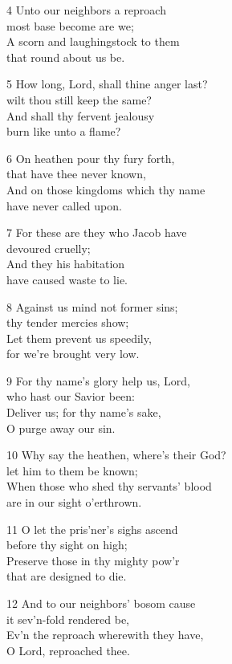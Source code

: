 4 Unto our neighbors a reproach\\
most base become are we;\\
A scorn and laughingstock to them\\
that round about us be.

5 How long, Lord, shall thine anger last?\\
wilt thou still keep the same?\\
And shall thy fervent jealousy\\
burn like unto a flame?

6 On heathen pour thy fury forth,\\
that have thee never known,\\
And on those kingdoms which thy name\\
have never called upon.

7 For these are they who Jacob have\\
devoured cruelly;\\
And they his habitation\\
have caused waste to lie.

8 Against us mind not former sins;\\
thy tender mercies show;\\
Let them prevent us speedily,\\
for we’re brought very low.

9 For thy name’s glory help us, Lord,\\
who hast our Savior been:\\
Deliver us; for thy name’s sake,\\
O purge away our sin.

10 Why say the heathen, where’s their God?\\
let him to them be known;\\
When those who shed thy servants’ blood\\
are in our sight o’erthrown.

11 O let the pris’ner’s sighs ascend\\
before thy sight on high;\\
Preserve those in thy mighty pow’r\\
that are designed to die.

12 And to our neighbors’ bosom cause\\
it sev’n-fold rendered be,\\
Ev’n the reproach wherewith they have,\\
O Lord, reproached thee.

